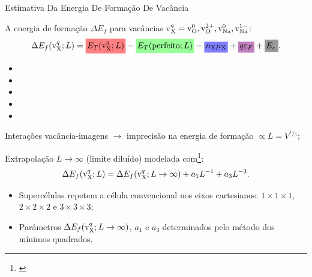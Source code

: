 \begin{frame}{Estimativa Da Energia De Formação De Vacância}
	\begin{itemize}{\small%
		\item A energia de formação $\Delta E_f$ para vacâncias v$_{\ce{X}}^{q} = \text{v}_{\ce{O}}^{0}, \text{v}_{\ce{O}}^{2+}, \text{v}_{\ce{Na}}^{0}, \text{v}_{\ce{Na}}^{1-}$:
		\begin{equation}
			\Delta E_f (\text{v}_{\ce{X}}^{q}; L) =
			\tikz[baseline] {\node[anchor=base, fill=red!50] (part1) {$\!E_T (\text{v}_{\ce{X}}^{q}; L)\!$};} -
			\tikz[baseline] {\node[anchor=base, fill=green!40] (part2) {$\!E_T (\text{perfeito}; L)\!$};} -
			\tikz[baseline] {\node[anchor=base, fill=blue!50] (part3) {$\!n_{\ce{X}} \mu_{\ce{X}}\!$};} +
			\tikz[baseline] {\node[anchor=base, fill=violet!50] (part4) {$\!q \varepsilon_F\!$};} +
			\tikz[baseline] {\node[anchor=base, fill=black!40] (part5) {$\!E_c$};}.
		\end{equation}
		\begin{itemize}
			\footnotesize
			\item{}
			\item{}
			\item{}
			\item{}
			\item{}
		\end{itemize}
		\item Interações vacância-imagens $\to$ imprecisão na energia de formação $\propto L = V^{{}^{1}\!/{}_{3}}$;
		\item Extrapolação $L\to\infty$ (limite diluído) modelada com\footnote[frame]{\cite{castleton_managing_2006}}:
		\begin{equation}
			\Delta E_f (\text{v}_{\ce{X}}^{q}; L) = \Delta E_f (\text{v}_{\ce{X}}^{q}; L\to\infty) + a_1 L^{-1} + a_3 L^{-3}.
		\end{equation}
		\begin{itemize}
			\item Supercélulas repetem a célula convencional nos eixos cartesianos: $1\!\times\!1\!\times\!1$, $2\!\times\!2\!\times\!2$ e $3\!\times\!3\!\times\!3$;
			\item Parâmetros $\Delta E_f (\text{v}_{\ce{X}}^{q}; L\to\infty)$, $a_1$ e $a_3$ determinados pelo método dos mínimos quadrados.
		\end{itemize}
		}
	\end{itemize}
\end{frame}
